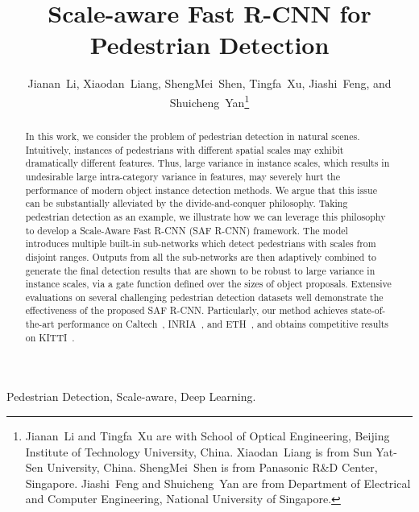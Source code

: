 \documentclass[journal]{IEEEtran}
\begin{document}
 
\title{Scale-aware Fast R-CNN for Pedestrian Detection}
 

\author{Jianan~Li,
        Xiaodan~Liang,
        ShengMei~Shen,
        Tingfa~Xu,
        Jiashi~Feng,
        and Shuicheng~Yan\thanks{Jianan~Li and Tingfa~Xu are with School of Optical Engineering, Beijing Institute of Technology University, China. 
Xiaodan~Liang is from Sun Yat-Sen University, China.
ShengMei~Shen is from Panasonic R\&D Center, Singapore. 
Jiashi~Feng and Shuicheng~Yan are from Department of Electrical and Computer Engineering, National University of Singapore.
}}







\maketitle

\begin{abstract}
In this work, we consider the problem of pedestrian detection in natural scenes. Intuitively, instances of pedestrians with different spatial scales may exhibit dramatically different features. Thus, large variance in instance scales, which  results in  undesirable large intra-category variance in features, may severely hurt the performance of modern object instance detection methods.  We argue that this issue can be substantially alleviated by the divide-and-conquer philosophy. Taking pedestrian detection as an example, we illustrate how we can leverage this philosophy to develop a Scale-Aware Fast R-CNN (SAF R-CNN) framework. The model introduces multiple built-in sub-networks which detect pedestrians with scales from disjoint ranges. Outputs from all the sub-networks are then adaptively combined to generate the final detection results that are shown to be robust to large variance in instance scales, via a gate function defined over the sizes of object proposals. Extensive evaluations on several challenging pedestrian detection datasets well demonstrate the effectiveness of the proposed SAF R-CNN. Particularly, our method achieves state-of-the-art performance on Caltech~\cite{dollar2012pedestrian}, INRIA~\cite{dalal2005histograms}, and ETH~\cite{ess2007depth}, and obtains competitive results on KITTI~\cite{geiger2012we}.
\end{abstract}

\begin{IEEEkeywords}
	Pedestrian Detection, Scale-aware, Deep Learning.
\end{IEEEkeywords}
\end{document}
